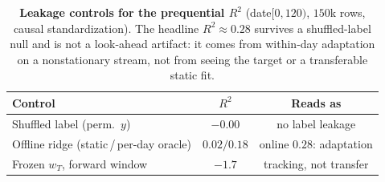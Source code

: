 \documentclass{article}
\begin{document}
\begin{table}[h]
\caption{\textbf{Leakage controls for the prequential $R^2$} (date$[0,120)$, $150$k rows,
causal standardization). The headline $R^2\approx0.28$ survives a shuffled-label null and is
not a look-ahead artifact: it comes from within-day adaptation on a nonstationary stream, not
from seeing the target or a transferable static fit.}
\label{tab:leakage}
\centering
\begin{small}
\begin{tabular}{lcc}
\toprule
Control & $R^2$ & Reads as \\
\midrule
Shuffled label (perm.\ $y$)               & $-0.00$     & no label leakage \\
Offline ridge (static\,/\,per-day oracle) & $0.02/0.18$ & online $0.28$: adaptation \\
Frozen $w_T$, forward window              & $-1.7$      & tracking, not transfer \\
\bottomrule
\end{tabular}
\end{small}
\end{table}
\end{document}
